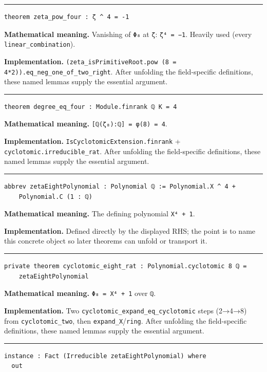 \documentclass[UTF8,a4paper,11pt,fontset=fandol]{ctexart}
\theoremstyle{definition}
\newcommand{\statementsep}{\par\medskip\hrule\medskip}
\begin{document}
\statementsep
\begin{verbatim}
theorem zeta_pow_four : ζ ^ 4 = -1
\end{verbatim}
\noindent\textbf{Mathematical meaning.} Vanishing of \texttt{Φ₈} at \texttt{ζ}: \texttt{ζ⁴ = −1}. Heavily used (every \texttt{linear\_\allowbreak{}combination}).\par
\noindent\textbf{Implementation.} \texttt{(zeta\_\allowbreak{}isPrimitiveRoot.\allowbreak{}pow (8 = 4*2)).\allowbreak{}eq\_\allowbreak{}neg\_\allowbreak{}one\_\allowbreak{}of\_\allowbreak{}two\_\allowbreak{}right}. After unfolding the field-specific definitions, these named lemmas supply the essential argument.\par
\statementsep
\begin{verbatim}
theorem degree_eq_four : Module.finrank ℚ K = 4
\end{verbatim}
\noindent\textbf{Mathematical meaning.} \texttt{[ℚ(ζ₈):ℚ] = φ(8) = 4}.\par
\noindent\textbf{Implementation.} \texttt{IsCyclotomicExtension.\allowbreak{}finrank} + \texttt{cyclotomic.\allowbreak{}irreducible\_\allowbreak{}rat}. After unfolding the field-specific definitions, these named lemmas supply the essential argument.\par
\statementsep
\begin{verbatim}
abbrev zetaEightPolynomial : Polynomial ℚ := Polynomial.X ^ 4 +
    Polynomial.C (1 : ℚ)
\end{verbatim}
\noindent\textbf{Mathematical meaning.} The defining polynomial \texttt{X⁴ + 1}.\par
\noindent\textbf{Implementation.} Defined directly by the displayed RHS; the point is to name this concrete object so later theorems can unfold or transport it.\par
\statementsep
\begin{verbatim}
private theorem cyclotomic_eight_rat : Polynomial.cyclotomic 8 ℚ =
    zetaEightPolynomial
\end{verbatim}
\noindent\textbf{Mathematical meaning.} \texttt{Φ₈ = X⁴ + 1} over \texttt{ℚ}.\par
\noindent\textbf{Implementation.} Two \texttt{cyclotomic\_\allowbreak{}expand\_\allowbreak{}eq\_\allowbreak{}cyclotomic} steps (2→4→8) from \texttt{cyclotomic\_\allowbreak{}two}, then \texttt{expand\_\allowbreak{}X}/\texttt{ring}. After unfolding the field-specific definitions, these named lemmas supply the essential argument.\par
\statementsep
\begin{verbatim}
instance : Fact (Irreducible zetaEightPolynomial) where
  out
\end{verbatim}
\end{document}
